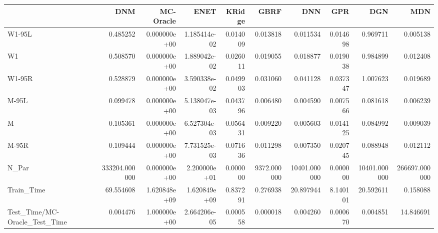 \begin{tabular}{lrrrrrrrrr}
\toprule
{} &            DNM &     MC-Oracle &          ENET &    KRidge &         GBRF &           DNN &       GPR &           DGN &            MDN \\
\midrule
W1-95L                        &       0.485252 &  0.000000e+00 &  1.185414e-02 &  0.014009 &     0.013818 &      0.011534 &  0.014698 &      0.969711 &       0.005138 \\
W1                            &       0.508570 &  0.000000e+00 &  1.889042e-02 &  0.026011 &     0.019055 &      0.018877 &  0.019038 &      0.984899 &       0.012408 \\
W1-95R                        &       0.528879 &  0.000000e+00 &  3.590338e-02 &  0.049903 &     0.031060 &      0.041128 &  0.037347 &      1.007623 &       0.019689 \\
M-95L                         &       0.099478 &  0.000000e+00 &  5.138047e-03 &  0.043796 &     0.006480 &      0.004590 &  0.007566 &      0.081618 &       0.006239 \\
M                             &       0.105361 &  0.000000e+00 &  6.527304e-03 &  0.056431 &     0.009220 &      0.005603 &  0.014125 &      0.084992 &       0.009039 \\
M-95R                         &       0.109444 &  0.000000e+00 &  7.731525e-03 &  0.071636 &     0.011298 &      0.007350 &  0.020745 &      0.088948 &       0.012112 \\
N\_Par                         &  333204.000000 &  0.000000e+00 &  2.200000e+01 &  0.000000 &  9372.000000 &  10401.000000 &  0.000000 &  10401.000000 &  266697.000000 \\
Train\_Time                    &      69.554608 &  1.620848e+09 &  1.620849e+09 &  0.837291 &     0.276938 &     20.897944 &  8.140101 &     20.592611 &       0.158088 \\
Test\_Time/MC-Oracle\_Test\_Time &       0.004476 &  1.000000e+00 &  2.664206e-05 &  0.000558 &     0.000018 &      0.004260 &  0.000670 &      0.004851 &      14.846691 \\
\bottomrule
\end{tabular}
